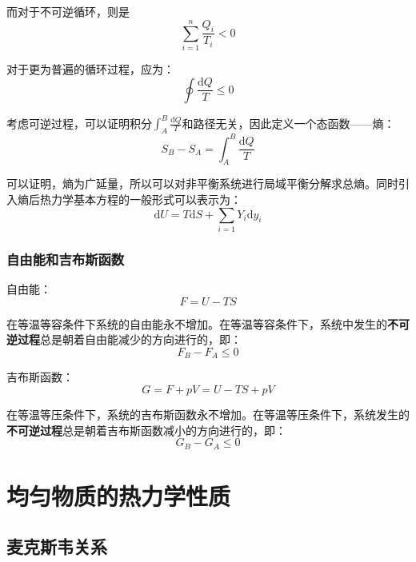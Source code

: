 \documentclass[UTF8]{ctexart}
\newcommand{\dif}{\mathrm{d}}
\begin{document}
	而对于不可逆循环，则是
	\begin{equation}
		\sum_{i=1}^{n} \frac{Q_{i}}{T_{i}}<0
	\end{equation}
	
	对于更为普遍的循环过程，应为：
	\begin{equation}
		\oint \frac{\dif Q}{T} \leq 0
	\end{equation}
	
	考虑可逆过程，可以证明积分$ \int_{A}^{B} \frac{\dif Q}{T} $和路径无关，因此定义一个态函数——熵：
	\begin{equation}
		S_{B}-S_{A} =\int_{A}^{B} \frac{\dif Q}{T}
	\end{equation}
	
	可以证明，熵为广延量，所以可以对非平衡系统进行局域平衡分解求总熵。同时引入熵后热力学基本方程的一般形式可以表示为：
	\begin{equation}
		\dif U =T \dif S + \sum_{i=1} Y_{i} \dif y_{i}
	\end{equation}
	
	\subsubsection{自由能和吉布斯函数}
	自由能：
	\begin{equation}
		F= U-TS
	\end{equation}
	
\noindent 在等温等容条件下系统的自由能永不增加。在等温等容条件下，系统中发生的\textbf{不可逆过程}总是朝着自由能减少的方向进行的，即：
\begin{equation}
	F_{B}-F_{A} \leq 0
\end{equation}

	吉布斯函数：
	\begin{equation}
		G= F+pV= U-TS+pV
	\end{equation}
	
\noindent 在等温等压条件下，系统的吉布斯函数永不增加。在等温等压条件下，系统发生的\textbf{不可逆过程}总是朝着吉布斯函数减小的方向进行的，即：
\begin{equation}
	G_{B} - G_{A} \leq 0
\end{equation}

	\section{均匀物质的热力学性质}
	\subsection{麦克斯韦关系}
	
\end{document}

